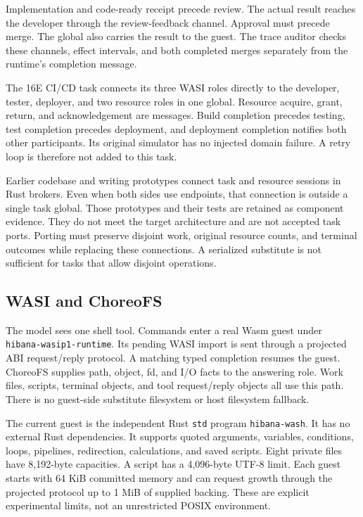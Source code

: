 \documentclass[10pt]{article}
\begin{document}
Implementation and code-ready receipt precede review. The actual result reaches
the developer through the review-feedback channel. Approval must precede merge.
The global also carries the result to the guest. The trace auditor checks these
channels, effect intervals, and both completed merges separately from the
runtime's completion message.

The 16E CI/CD task connects its three WASI roles directly to the developer,
tester, deployer, and two resource roles in one global. Resource acquire, grant,
return, and acknowledgement are messages. Build completion precedes testing,
test completion precedes deployment, and deployment completion notifies both
other participants. Its original simulator has no injected domain failure.
A retry loop is therefore not added to this task.

Earlier codebase and writing prototypes connect task and resource sessions in
Rust brokers. Even when both sides use endpoints, that connection is outside
a single task global. Those prototypes and their tests are retained as component
evidence. They do not meet the target architecture and are not accepted task
ports. Porting must preserve disjoint work, original resource counts, and
terminal outcomes while replacing these connections. A serialized substitute
is not sufficient for tasks that allow disjoint operations.

\subsection{WASI and ChoreoFS}
The model sees one shell tool. Commands enter a real Wasm guest under
\texttt{hibana-wasip1-runtime}. Its pending WASI import is sent through a
projected ABI request/reply protocol. A matching typed completion resumes the
guest. ChoreoFS supplies path, object, fd, and I/O facts to the answering role.
Work files, scripts, terminal objects, and tool request/reply objects all use
this path. There is no guest-side substitute filesystem or host filesystem
fallback.

The current guest is the independent Rust \texttt{std} program
\texttt{hibana-wash}. It has no external Rust dependencies. It supports quoted
arguments, variables, conditions, loops, pipelines, redirection, calculations,
and saved scripts. Eight private files have 8,192-byte capacities. A script has
a 4,096-byte UTF-8 limit. Each guest starts with 64 KiB committed memory and can
request growth through the projected protocol up to 1 MiB of supplied backing.
These are explicit experimental limits, not an unrestricted POSIX environment.
\end{document}
